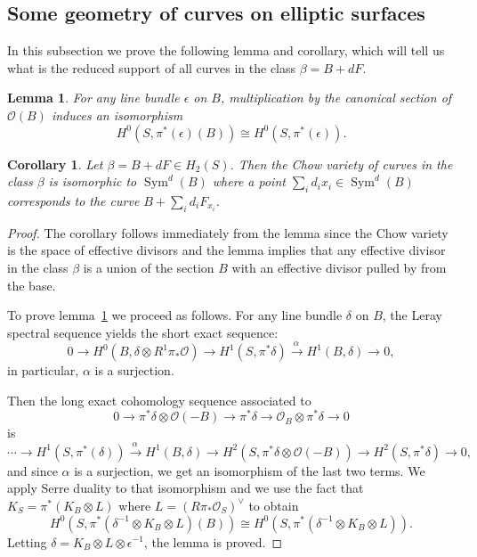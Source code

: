 \documentclass{amsart}
\newtheorem{lemma}[theorem]{Lemma}
\newtheorem{corollary}[theorem]{Corollary}
\theoremstyle{definition}
\renewcommand{\O}{\mathcal{O}}
\newcommand{\rt}[1]{\stackrel{#1\,}{\rightarrow}}
\newcommand{\Rt}[1]{\stackrel{#1\,}{\longrightarrow}}
\newcommand{\Sym}{\operatorname{Sym}}
\begin{document}
\subsection{Some geometry of curves on elliptic surfaces}\label{subsec: geometry of curves on elliptic surfaces}

In this subsection we prove the following lemma and corollary, which will tell us what is the reduced support of all curves in the class $\beta =B+dF$.

\begin{lemma}\label{lem: H0 (pi* (D) (B))=H0 (pi* (D))}
For any line bundle $\epsilon $ on $B$, multiplication by the
canonical section of $\O (B)$ induces an isomorphism
\[
H^{0} (S,\pi ^{*} (\epsilon ) (B)) \cong H^{0} (S,\pi ^{*} (\epsilon )).
\]
\end{lemma}

\begin{corollary} \label{cor: chow(beta) = sym (B)}
Let $\beta = B+dF \in H_{2} (S)$. Then the Chow variety of curves in
the class $\beta $ is isomorphic to $\Sym ^{d} (B)$ where a point
$\sum _{i}d_{i} x_{i}\in \Sym ^{d} (B)$ corresponds to the curve
$B+\sum _{i}d_{i} F_{x_{i}}$.
\end{corollary}

\begin{proof}
The corollary follows immediately from the lemma since the Chow
variety is the space of effective divisors and the lemma implies that
any effective divisor in the class $\beta $ is a union of the section
$B$ with an effective divisor pulled by from the base.

To prove lemma~\ref{lem: H0 (pi* (D) (B))=H0 (pi* (D))} we proceed as
follows. For any line bundle $\delta $ on $B$, the Leray spectral
sequence yields the short exact sequence:
\[
0\to H^{0} (B,\delta \otimes R^{1}\pi _{*}\O )\to H^{1} (S,\pi ^{*}\delta )\Rt{\alpha } H^{1} (B,\delta )\to 0,
\]
in particular, $\alpha $ is a surjection.

Then the long exact cohomology sequence associated to 
\[
0\to \pi ^{*}\delta \otimes \O (-B)\to \pi ^{*}\delta \to \O _{B}\otimes \pi ^{*}\delta \to 0
\]
is
\[
\dotsb \to H^{1} (S,\pi ^{*} (\delta ))\rt{\alpha }H^{1} (B,\delta )\to H^{2} (S,\pi ^{*}\delta \otimes \O (-B))\to H^{2} (S,\pi ^{*}\delta )\to 0,
\]
and since $\alpha $ is a surjection, we get an isomorphism of the last
two terms. We apply Serre duality to that isomorphism and we use the
fact that $K_{S} = \pi ^{*} (K_{B}\otimes L)$ where $L = \left(R\pi
_{*}\O _{S} \right)^{\vee }$ \cite[prop?]{Fr-Mo} to obtain
\[
H^{0} (S,\pi ^{*} (\delta ^{-1}\otimes K_{B}\otimes L) (B)) \cong H^{0}(S,\pi ^{*} (\delta ^{-1}\otimes K_{B}\otimes L)).
\]
Letting $\delta =K_{B}\otimes L\otimes \epsilon ^{-1}$, the lemma is
proved. 
\end{proof}
\end{document}
